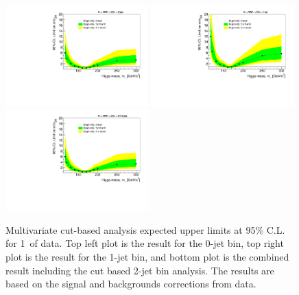 \begin{figure}[!htbp]
\begin{center}
   \includegraphics[width=0.49\textwidth]{figures/limits_0j_1000pb_datalike_mva_1.pdf}
   \includegraphics[width=0.49\textwidth]{figures/limits_1j_1000pb_datalike_mva_1.pdf}
   \includegraphics[width=0.49\textwidth]{figures/limits_nj_1000pb_datalike_mva_1.pdf}
   \caption{Multivariate cut-based analysis expected upper limits at 95\% C.L. for 1\ifb\ of data. Top left plot 
   is the result for the 0-jet bin, top right plot is the result for the 1-jet bin, and 
   bottom plot is the combined result including the cut based 2-jet bin analysis. The results 
   are based on the signal and backgrounds corrections from data.}
   \label{fig:mvabase_uls_datalike}
\end{center}
\end{figure}

